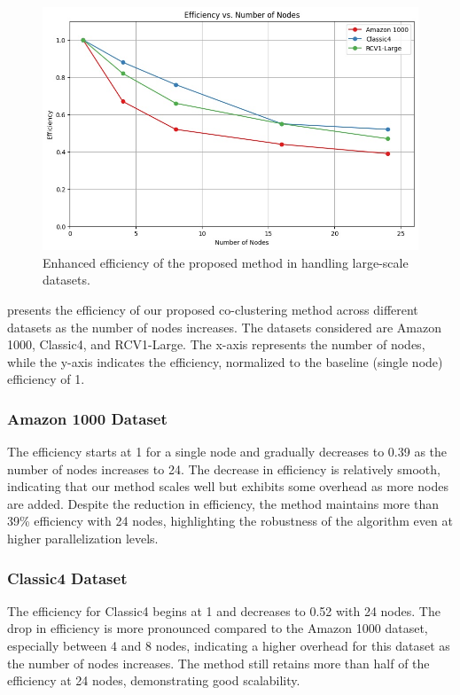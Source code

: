 \documentclass[journal]{IEEEtran}
\begin{document}
\begin{figure}[htbp]
  \centering
  \includegraphics[width=0.8\linewidth]{efficiency.jpg}
  \caption{Enhanced efficiency of the proposed method in handling large-scale datasets.}
  \label{fig:efficiency}
\end{figure}

 presents the efficiency of our proposed co-clustering method across different datasets as the number of nodes increases. The datasets considered are Amazon 1000, Classic4, and RCV1-Large. The x-axis represents the number of nodes, while the y-axis indicates the efficiency, normalized to the baseline (single node) efficiency of 1.

\subsubsection{Amazon 1000 Dataset}
The efficiency starts at 1 for a single node and gradually decreases to 0.39 as the number of nodes increases to 24. The decrease in efficiency is relatively smooth, indicating that our method scales well but exhibits some overhead as more nodes are added. Despite the reduction in efficiency, the method maintains more than 39\% efficiency with 24 nodes, highlighting the robustness of the algorithm even at higher parallelization levels.

\subsubsection{Classic4 Dataset}
The efficiency for Classic4 begins at 1 and decreases to 0.52 with 24 nodes. The drop in efficiency is more pronounced compared to the Amazon 1000 dataset, especially between 4 and 8 nodes, indicating a higher overhead for this dataset as the number of nodes increases. The method still retains more than half of the efficiency at 24 nodes, demonstrating good scalability.
\end{document}
